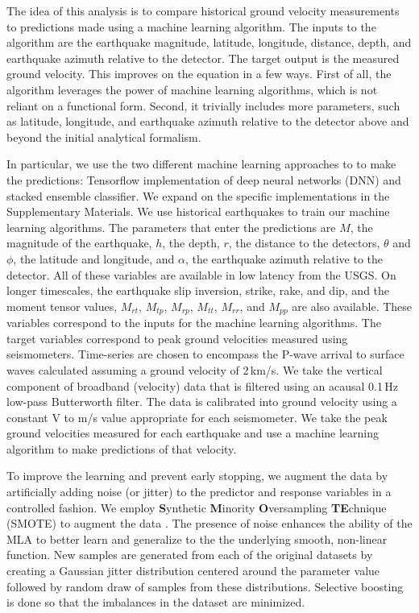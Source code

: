 \documentclass[preprint, aps, showpacs]{revtex4-1}
\begin{document}
The idea of this analysis is to compare historical ground velocity measurements 
to predictions made using a machine learning algorithm. 
The inputs to the algorithm are the earthquake magnitude, latitude, longitude, distance, depth, and earthquake azimuth relative to the detector. 
The target output is the measured ground velocity.
This improves on the equation in a few ways.
First of all, the algorithm leverages the power of machine learning algorithms, which is not reliant on a functional form.
Second, it trivially includes more parameters, such as latitude, longitude, and earthquake azimuth relative to the detector above and beyond the initial analytical formalism. 

In particular, we use the two different machine learning approaches to to make the predictions: Tensorflow implementation of deep neural networks (DNN) and stacked ensemble classifier.
We expand on the specific implementations in the Supplementary Materials.
We use historical earthquakes to train our machine learning algorithms. The parameters that enter the predictions are $M$, the magnitude of the earthquake, $h$, the depth, $r$, the distance to the detectors, $\theta$ and $\phi$, the latitude and longitude, and $\alpha$, the earthquake azimuth relative to the detector.
All of these variables are available in low latency from the USGS.
On longer timescales, the earthquake slip inversion, strike, rake, and dip, and the moment tensor values, $M_{rt}$, $M_{tp}$, $M_{rp}$, $M_{tt}$, $M_{rr}$, and $M_{pp}$ are also available.
These variables correspond to the inputs for the machine learning algorithms.
The target variables correspond to peak ground velocities measured using seismometers.
Time-series are chosen to encompass the P-wave arrival to surface waves calculated assuming a ground velocity of 2\,km/s.
We take the vertical component of broadband (velocity) data that is filtered using an acausal 0.1\,Hz low-pass Butterworth filter.
The data is calibrated into ground velocity using a constant V to m/s value appropriate for each seismometer.
We take the peak ground velocities measured for each earthquake and use a machine learning algorithm to make predictions of that velocity.

To improve the learning and prevent early stopping, we augment the data by artificially adding noise (or jitter) to the predictor and response variables in a controlled fashion. We employ \textbf{S}ynthetic \textbf{M}inority \textbf{O}versampling \textbf{TE}chnique (SMOTE) to augment the data \cite{ChBo2011}. The presence of noise enhances the ability of the MLA to better learn and generalize to the the underlying smooth, non-linear function. New samples are generated from each of the original datasets by creating a Gaussian jitter distribution centered around the parameter value followed by random draw of samples from these distributions. Selective boosting is done so that the imbalances in the dataset are minimized. 
\end{document}
